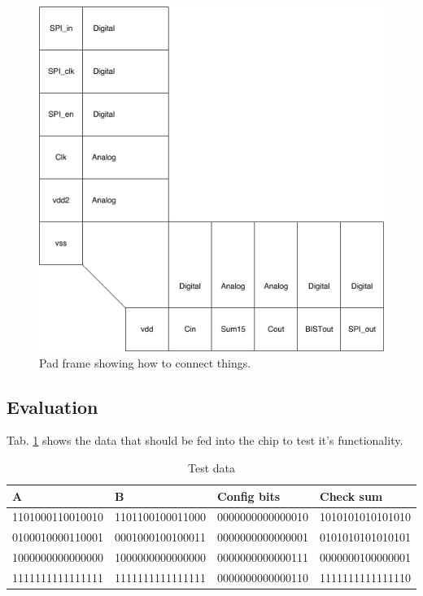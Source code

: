 \begin{figure}[H]
\centering
\captionsetup{justification=centering}
\includegraphics[scale=0.1]{../figures/padframe.png}
\caption{Pad frame showing how to connect things.} \label{fig:padframe}
\end{figure}

               

\subsection{Evaluation}
Tab. \ref{tab:test_data} shows the data that should be fed into the chip to test it's functionality.

\begin{table}[H]
  \caption{Test data}
  \centering
  \begin{tabularx}{\linewidth}{|X|X|X|X|}
    \hline
    \textbf{A} & \textbf{B} & \textbf{Config bits} & \textbf{Check sum} \\ \hline
    1101000110010010 & 1101100100011000 & 0000000000000010 & 1010101010101010\\ \hline
    0100010000110001 & 0001000100100011 & 0000000000000001 & 0101010101010101\\ \hline
    1000000000000000 & 1000000000000000 & 0000000000000111 & 0000000100000001\\ \hline
    1111111111111111 & 1111111111111111 & 0000000000000110 & 1111111111111110\\ \hline
  \end{tabularx}
  \label{tab:test_data}
\end{table}